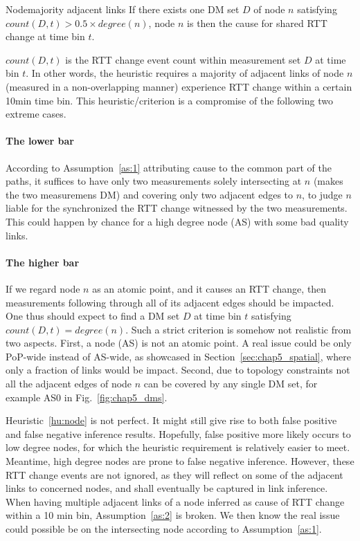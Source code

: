 \begin{heuristic}{Node}{majority adjacent links}\label{hu:node}
If there exists one \ac{DM} set $D$ of node $n$ satisfying $count(D, t) > 0.5 \times degree(n)$,  node $n$ is then the cause for shared RTT change at time bin $t$. 
\end{heuristic}

$count(D,t)$ is the RTT change event count within measurement set $D$ at time bin $t$. In other words, the heuristic requires a majority of adjacent links of node $n$ (measured in a non-overlapping manner) experience RTT change within a certain 10min time bin. This heuristic/criterion is a compromise of the following two extreme cases.

\paragraph{The lower bar} According to Assumption~\ref{as:1} attributing cause to the common part of the paths, it suffices to have only two measurements solely intersecting at $n$ (makes the two measuremens \ac{DM}) and covering only two adjacent edges to $n$, to judge $n$ liable for the synchronized the RTT change witnessed by the two measurements. This could happen by chance for a high degree node (AS) with some bad quality links.

\paragraph{The higher bar} If we regard node $n$ as an atomic point, and it causes an RTT change, then measurements following through all of its adjacent edges should be impacted. One thus should expect to find a \ac{DM} set $D$ at time bin $t$ satisfying $count(D, t) = degree(n)$. Such a strict criterion is somehow not realistic from two aspects. First, a node (AS) is not an atomic point. A real issue could be only PoP-wide instead of AS-wide, as showcased in Section~\ref{sec:chap5_spatial}, where only a fraction of links would be impact. Second, due to topology constraints not all the adjacent edges of node $n$ can be covered by any single \ac{DM} set, for example AS0 in Fig.~\ref{fig:chap5_dms}.

Heuristic~\ref{hu:node} is not perfect. It might still give rise to both false positive and false negative inference results. Hopefully, false positive more likely occurs to low degree nodes, for which the heuristic requirement is relatively easier to meet. Meantime, high degree nodes are prone to false negative inference. However, these RTT change events are not ignored, as they will reflect on some of the adjacent links to concerned nodes, and shall eventually be captured in link inference. When having multiple adjacent links of a node inferred as cause of RTT change within a 10 min bin, Assumption~\ref{as:2} is broken. We then know the real issue could possible be on the intersecting node according to Assumption~\ref{as:1}.

